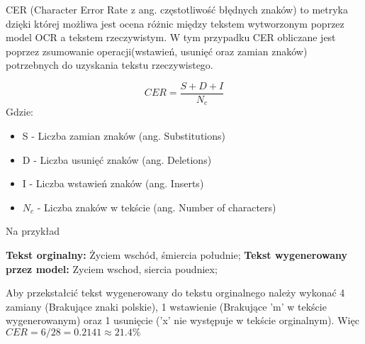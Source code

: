 \label{sec:CER}
CER (Character Error Rate z ang. częstotliwość błędnych znaków) to metryka dzięki której możliwa jest ocena
różnic między tekstem wytworzonym poprzez model OCR a tekstem rzeczywistym. W tym 
przypadku CER obliczane jest poprzez zsumowanie operacji(wstawień, usunięć oraz zamian znaków) potrzebnych
do uzyskania tekstu rzeczywistego. 

\[
    CER=\frac{S+D+I}{N_c}
\]
Gdzie:
\begin{itemize}
    \item S - Liczba zamian znaków (ang. Substitutions)
    \item D - Liczba usunięć znaków (ang. Deletions)
    \item I - Liczba wstawień znaków (ang. Inserts)
    \item $N_c$ - Liczba znaków w tekście (ang. Number of characters)
\end{itemize}

Na przykład \linebreak

    \textbf{Tekst orginalny: }Życiem wschód, śmiercia południe; \linebreak
    \textbf{Tekst wygenerowany przez model: }Zyciem wschod, siercia poudniex; \linebreak

Aby przekstałcić tekst wygenerowany do tekstu orginalnego należy wykonać 4 zamiany (Brakujące znaki polskie),
1 wstawienie (Brakujące 'm' w tekście wygenerowanym) oraz 1 usunięcie ('x' nie występuje w tekście orginalnym).
Więc $CER=6/28=0.2141\approx 21.4\%$
